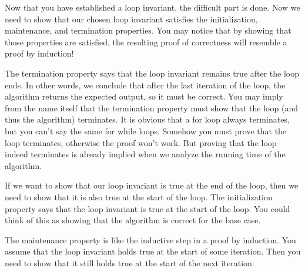 Now that you have established a loop invariant, the difficult part is done. Now we need to show that our chosen loop invariant satisfies the initialization, maintenance, and termination properties. You may notice that by showing that those properties are satisfied, the resulting proof of correctness will resemble a proof by induction!

The termination property says that the loop invariant remains true after the loop ends. In other words, we conclude that after the last iteration of the loop, the algorithm returns the expected output, so it must be correct. You may imply from the name itself that the termination property must show that the loop (and thus the algorithm) terminates. It is obvious that a for loop always terminates, but you can't say the same for while loops. Somehow you must prove that the loop terminates, otherwise the proof won't work. But proving that the loop indeed terminates is already implied when we analyze the running time of the algorithm.

If we want to show that our loop invariant is true at the end of the loop, then we need to show that it is also true at the start of the loop. The initialization property says that the loop invariant is true at the start of the loop. You could think of this as showing that the algorithm is correct for the base case.

The maintenance property is like the inductive step in a proof by induction. You assume that the loop invariant holds true at the start of some iteration. Then you need to show that it still holds true at the start of the next iteration.

